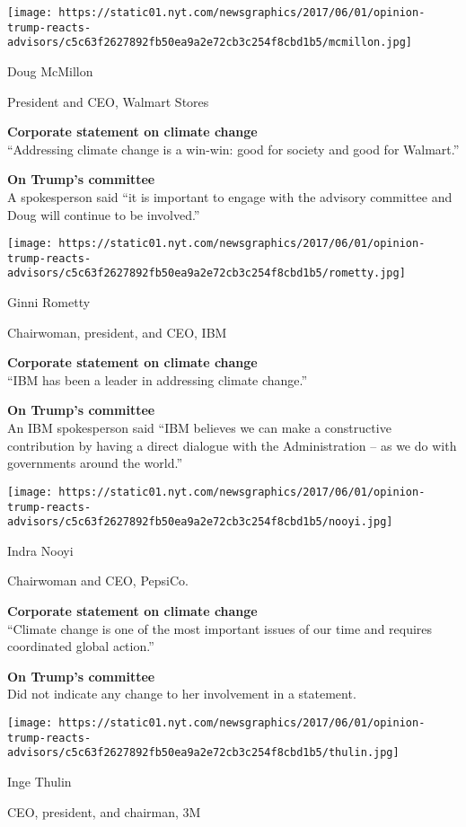 \texttt{[image: https://static01.nyt.com/newsgraphics/2017/06/01/opinion-trump-reacts-advisors/c5c63f2627892fb50ea9a2e72cb3c254f8cbd1b5/mcmillon.jpg]}

Doug McMillon

President and CEO, Walmart Stores

\textbf{Corporate statement on climate change}\\
``Addressing climate change is a win-win: good for society and good for
Walmart.''

\textbf{On Trump's committee}\\
A spokesperson said ``it is important to engage with the advisory
committee and Doug will continue to be involved.''

\texttt{[image: https://static01.nyt.com/newsgraphics/2017/06/01/opinion-trump-reacts-advisors/c5c63f2627892fb50ea9a2e72cb3c254f8cbd1b5/rometty.jpg]}

Ginni Rometty

Chairwoman, president, and CEO, IBM

\textbf{Corporate statement on climate change}\\
``IBM has been a leader in addressing climate change.''

\textbf{On Trump's committee}\\
An IBM spokesperson said ``IBM believes we can make a constructive
contribution by having a direct dialogue with the Administration -- as
we do with governments around the world.''

\texttt{[image: https://static01.nyt.com/newsgraphics/2017/06/01/opinion-trump-reacts-advisors/c5c63f2627892fb50ea9a2e72cb3c254f8cbd1b5/nooyi.jpg]}

Indra Nooyi

Chairwoman and CEO, PepsiCo.

\textbf{Corporate statement on climate change}\\
``Climate change is one of the most important issues of our time and
requires coordinated global action.''

\textbf{On Trump's committee}\\
Did not indicate any change to her involvement in a statement.

\texttt{[image: https://static01.nyt.com/newsgraphics/2017/06/01/opinion-trump-reacts-advisors/c5c63f2627892fb50ea9a2e72cb3c254f8cbd1b5/thulin.jpg]}

Inge Thulin

CEO, president, and chairman, 3M

